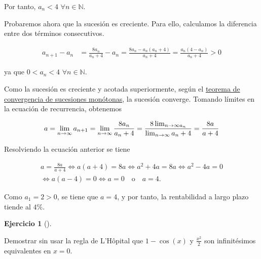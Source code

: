 \documentclass[
  a4paper,
]{scrreport}
\theoremstyle{definition}
\newtheorem{exercise}{Ejercicio}[chapter]
\theoremstyle{remark}
\begin{document}
\begin{tcolorbox}
Por tanto, \(a_n < 4\) \(\forall n\in\mathbb{N}\).

Probaremos ahora que la sucesión es creciente. Para ello, calculamos la
diferencia entre dos términos consecutivos.

\begin{align*}
a_{n+1}-a_n 
&= \frac{8a_n}{a_n+4}-a_n 
= \frac{8a_n-a_n(a_n+4)}{a_n+4} 
= \frac{a_n(4-a_n)}{a_n+4}
> 0
\end{align*}

ya que \(0<a_n<4\) \(\forall n\in\mathbb{N}\).

Como la sucesión es creciente y acotada superiormente, según el
\href{https://aprendeconalf.es/analisis-manual/04-sucesiones.html\#thm-convergencia-monotona}{teorema
de convergencia de sucesiones monótonas}, la sucesión converge. Tomando
límites en la ecuación de recurrencia, obtenemos

\[
a 
= \lim_{n\to\infty} a_{n+1} 
= \lim_{n\to\infty} \frac{8a_n}{a_n+4} 
= \frac{8\lim_{n\to\infty a_n}}{\lim_{n\to\infty} a_n+4} \\
= \frac{8a}{a+4}
\]

Resolviendo la ecuación anterior se tiene

\[
\begin{gathered}
a = \frac{8a}{a+4} 
\Leftrightarrow a(a+4) = 8a 
\Leftrightarrow a^2+4a = 8a 
\Leftrightarrow a^2-4a = 0 \\
\Leftrightarrow a(a-4) = 0
\Leftrightarrow a = 0 \quad \text{o} \quad a = 4.
\end{gathered}
\]

Como \(a_1 = 2 > 0\), se tiene que \(a = 4\), y por tanto, la
rentabilidad a largo plazo tiende al \(4\%\).

\end{tcolorbox}

\begin{exercise}[]\protect\hypertarget{exr-3}{}\label{exr-3}

Demostrar sin usar la regla de L'Hôpital que \(1 - \cos(x)\) y
\(\frac{x^2}{2}\) son infinitésimos equivalentes en \(x=0\).

\end{exercise}
\end{document}
